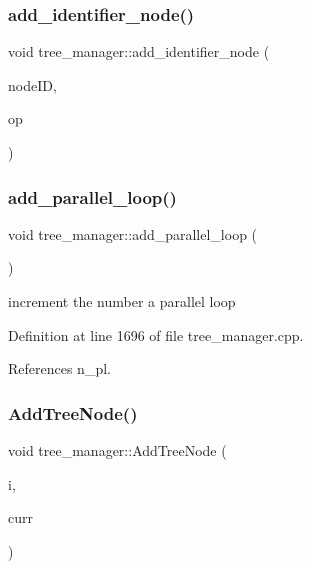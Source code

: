 \subsubsection{\texorpdfstring{add\+\_\+identifier\+\_\+node()}{add\_identifier\_node()}\hspace{0.1cm}{\footnotesize\ttfamily [2/2]}}
{\footnotesize\ttfamily void tree\+\_\+manager\+::add\+\_\+identifier\+\_\+node (\begin{DoxyParamCaption}\item[{unsigned int}]{node\+ID,  }\item[{const bool \&}]{op }\end{DoxyParamCaption})}

\mbox{\label{classtree__manager_ae5fe09a770ad90c17bf56cf9b3348218}} 
\subsubsection{\texorpdfstring{add\+\_\+parallel\+\_\+loop()}{add\_parallel\_loop()}}
{\footnotesize\ttfamily void tree\+\_\+manager\+::add\+\_\+parallel\+\_\+loop (\begin{DoxyParamCaption}{ }\end{DoxyParamCaption})}



increment the number a parallel loop 



Definition at line 1696 of file tree\+\_\+manager.\+cpp.



References n\+\_\+pl.

\mbox{\label{classtree__manager_ad41741bfa4e46fa272d0e321eb722893}} 
\subsubsection{\texorpdfstring{Add\+Tree\+Node()}{AddTreeNode()}}
{\footnotesize\ttfamily void tree\+\_\+manager\+::\+Add\+Tree\+Node (\begin{DoxyParamCaption}\item[{const unsigned int}]{i,  }\item[{const \hyperlink{tree__node_8hpp_a6ee377554d1c4871ad66a337eaa67fd5}{tree\+\_\+node\+Ref} \&}]{curr }\end{DoxyParamCaption})}



